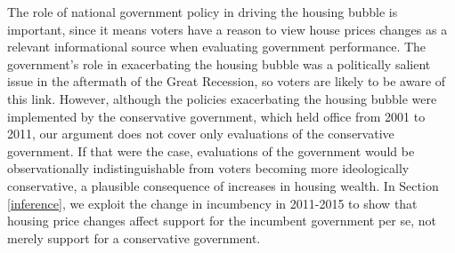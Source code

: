 \documentclass[12pt,a4paper]{article}
\begin{document}
The role of national government policy in driving the housing bubble is important, since it means voters have a reason to view house prices changes as a relevant informational source when evaluating government performance. The government's role in exacerbating the housing bubble was a politically salient issue in the aftermath of the Great Recession, so voters are likely to be aware of this link. However, although the policies exacerbating the housing bubble were implemented by the conservative government, which held office from 2001 to 2011, our argument does not cover only evaluations of the conservative government. If that were the case, evaluations of the government would be observationally indistinguishable from voters becoming more ideologically conservative, a plausible consequence of increases in housing wealth. In Section \ref{inference}, we exploit the change in incumbency in 2011-2015 to show that housing price changes affect support for the incumbent government per se, not merely support for a conservative government.


\end{document}
